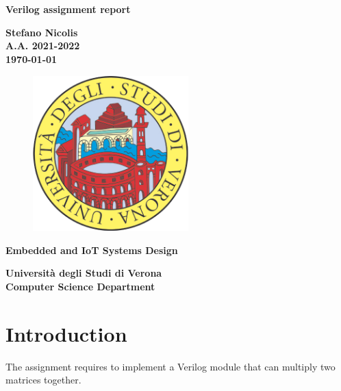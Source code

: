 \documentclass[12pt]{article}
\title{}
\author{Stefano Nicolis}
\begin{document}
\begin{titlepage}
   \begin{center}
       \vspace*{1cm}
 
	\large
      {\huge \textbf{Verilog assignment report} }
 
       \vspace{1.5cm}
 
       \textbf{Stefano Nicolis}\\
	\textbf{A.A. 2021-2022}\\
	\vspace{0.35cm}
	\textbf{\today}

\vfill
\begin{figure}[h!]
	\begin{center}
	  \includegraphics[height=6cm, width=6cm]{media/logounivr}
	\end{center}
\end{figure}
 
	\vfill
 	\textbf{Embedded and IoT Systems Design\\}
 
       \vspace{3cm}
 
      \begin{multicols}{2}
      \textbf{Università degli Studi di Verona\\
	 Computer Science Department}
	\end{multicols}
 
   \end{center}
\end{titlepage}

\tableofcontents

\section{Introduction}
The assignment requires to implement a Verilog module that can multiply two matrices together.
\end{document}

